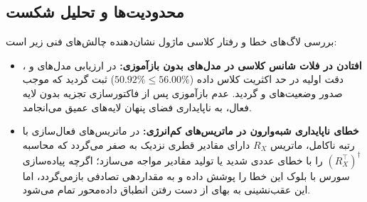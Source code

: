 \subsection{محدودیت‌ها و تحلیل شکست}
بررسی لاگ‌های خطا و رفتار کلاسی ماژول نشان‌دهنده چالش‌های فنی زیر است:
\begin{itemize}
    \item \textbf{افتادن در فلات شانس کلاسی در مدل‌های بدون بازآموزی:} در ارزیابی مدل‌های  و ، دقت اولیه در حد اکثریت کلاس داده ($50.92\% \le 56.00\%$) ثبت گردید که موجب صدور وضعیت‌های  و  گردید. عدم بازآموزی پس از فاکتورسازی تجزیه  بدون لایه  فعال، به ناپایداری فضای پنهان لایه‌های عمیق می‌انجامد.
    \item \textbf{خطای ناپایداری شبه‌وارون  در ماتریس‌های کم‌انرژی:} در ماتریس‌های فعال‌سازی با رتبه ناکامل، ماتریس $R_X$ دارای مقادیر قطری نزدیک به صفر می‌گردد که محاسبه $(R_X^\top)^\dagger$ را با خطای عددی شدید یا تولید مقادیر  مواجه می‌سازد؛ اگرچه پیاده‌سازی سورس با بلوک  این خطا را پوشش داده و به مقداردهی تصادفی بازمی‌گردد، اما این عقب‌نشینی به بهای از دست رفتن انطباق داده‌محور تمام می‌شود.
\end{itemize}
